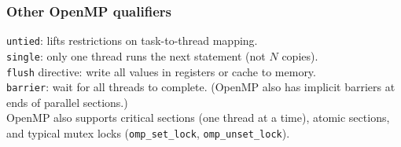 \documentclass[aspectratio=43]{beamer}
\newenvironment{changemargin}[1]{%
  \begin{list}{}{%
    \setlength{\topsep}{0pt}%
    \setlength{\leftmargin}{#1}%
    \setlength{\rightmargin}{1em}
    \setlength{\listparindent}{\parindent}%
    \setlength{\itemindent}{\parindent}%
    \setlength{\parsep}{\parskip}%
  }%
  \item[]}{\end{list}}
\begin{document}
\begin{frame}[fragile]
  \frametitle{Other OpenMP qualifiers}

  \begin{changemargin}{2cm}
    {\tt untied}: lifts restrictions on task-to-thread mapping.\\[1em]

    {\tt single}: only one thread runs the next statement (not $N$ copies).\\[1em]

    {\tt flush} directive: write all values in registers or cache to memory.\\[1em]

    {\tt barrier}: wait for all threads to complete. (OpenMP also has implicit
barriers at ends of parallel sections.)\\[1em]

    OpenMP also supports critical sections (one thread at a time), atomic
 sections, and typical mutex locks (\verb+omp_set_lock+,
 \verb+omp_unset_lock+).
  \end{changemargin}

\end{frame}
\end{document}
